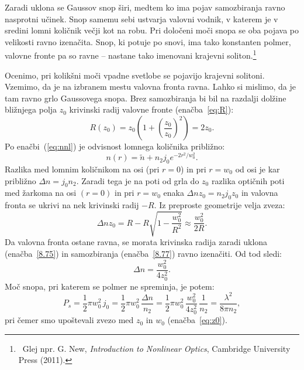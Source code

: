 Zaradi uklona se Gaussov snop širi, medtem ko ima pojav samozbiranja ravno nasprotni
učinek. Snop samemu sebi ustvarja valovni vodnik, v katerem je v sredini lomni količnik 
večji kot na robu. Pri določeni moči snopa se oba pojava po
velikosti ravno izenačita. Snop, ki potuje po snovi, ima tako konstanten polmer, 
valovne fronte pa so ravne -- nastane tako imenovani krajevni soliton.\footnote{~Glej npr. G. New, {\it Introduction
to Nonlinear Optics}, Cambridge University Press (2011).}

Ocenimo, pri kolikšni moči vpadne svetlobe se pojavijo krajevni solitoni. 
Vzemimo, da je na izbranem mestu valovna fronta ravna. Lahko si mislimo,
da je tam ravno grlo Gaussovega snopa. Brez samozbiranja bi bil na razdalji
dolžine bližnjega polja $z_{0}$ krivinski radij valovne fronte (enačba~\ref{eq:R}):
\begin{equation}
R(z_{0})=z_{0}\left( 1+\left(\frac{z_{0}}{z_{0}}\right)^{2}\right)=2z_{0}.
\label{8.75}
\end{equation}
Po enačbi~(\ref{eq:nnl}) je odvisnost lomnega količnika približno:
\begin{equation}
n(r)=\tilde{n}+n_2 j_0 e^{-2r^2/w_0^2}.
\label{8.76}
\end{equation}
Razlika med lomnim količnikom na osi (pri $r=0$) in pri $r = w_{0}$ 
od osi je kar približno $\Delta n= j_{0} n_{2}$.
Zaradi tega je na poti od grla do $z_0$ razlika optičnih poti med žarkoma na osi $(r=0)$ in 
pri $r= w_{0}$ enaka $\Delta nz_{0} = n_2 j_0 z_0$ in valovna fronta se 
ukrivi na nek krivinski radij $-R$. Iz preproste geometrije velja zveza:
\begin{equation}
\Delta nz_{0}=R-R\sqrt{1-\frac{w_{0}^{2}}{R^{2}}}\approx \frac{w_{0}^{2}}{2R}.
\label{8.77}
\end{equation}
Da valovna fronta ostane ravna, se morata krivinska radija zaradi uklona 
(enačba~\ref{8.75}) in samozbiranja (enačba~\ref{8.77}) ravno izenačiti. 
Od tod sledi:
\begin{equation}
\Delta n=\frac{w_{0}^{2}}{4z_{0}^{2}}.
\label{8.78}
\end{equation}
Moč snopa, pri katerem se polmer ne spreminja, je potem: 
\begin{equation}
P_{s}= \frac{1}{2}\pi w_0^2 \,j_0 = \frac{1}{2}\pi w_0^2 \, \frac{\Delta n}{n_2} = 
\frac{1}{2}\pi w_0^2 \,\frac{w_{0}^{2}}{4z_{0}^{2}}\,\frac{1}{n_2} = \frac{\lambda^2}{8\pi n_2},
\label{8.79}
\end{equation}
pri čemer smo upoštevali zvezo med $z_0$ in $w_0$ (enačba~\ref{eq:z0}).

